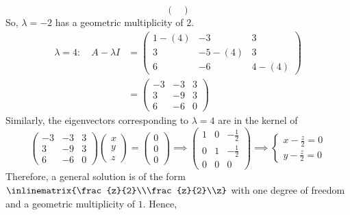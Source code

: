 \begin{exm}
\begin{flushleft}
\begin{equation*}
\begin{pmatrix}
			\end{pmatrix}
		\end{equation*}
		So, $\lambda=-2$ has a geometric multiplicity of $2$.
		\begin{align*}
			\boxed{\lambda=4}:\quad A- \lambda I & = \begin{pmatrix}
				1-(4) & -3     & 3     \\
				3     & -5-(4) & 3     \\
				6     & -6     & 4-(4)
			\end{pmatrix} \\
			                                     & = \begin{pmatrix}
				-3 & -3 & 3 \\
				3  & -9 & 3 \\
				6  & -6 & 0
			\end{pmatrix}
		\end{align*}
		Similarly, the eigenvectors corresponding to $\lambda=4$ are in the kernel of
		\begin{equation*}
			\begin{pmatrix}
				-3 & -3 & 3 \\
				3  & -9 & 3 \\
				6  & -6 & 0
			\end{pmatrix}\begin{pmatrix}
				x \\ y \\ z
			\end{pmatrix}=
			\begin{pmatrix}
				0 \\ 0 \\ 0
			\end{pmatrix}\implies\begin{pmatrix}
				1 & 0 & -\frac{1}{2} \\[4pt]
				0 & 1 & -\frac{1}{2} \\[4pt]
				0 & 0 & 0
			\end{pmatrix}\implies\begin{cases}
				x - \frac{z}{2} = 0 \\
				y - \frac{z}{2} = 0
			\end{cases}
		\end{equation*}
		Therefore, a general solution is of the form  $\inlinematrix{\frac{z}{2}\\\frac{z}{2}\\z}$
		with one degree of freedom and a geometric multiplicity of $1$. Hence,
		\begin{equation*}

\end{equation*}
\end{flushleft}
\end{exm}

